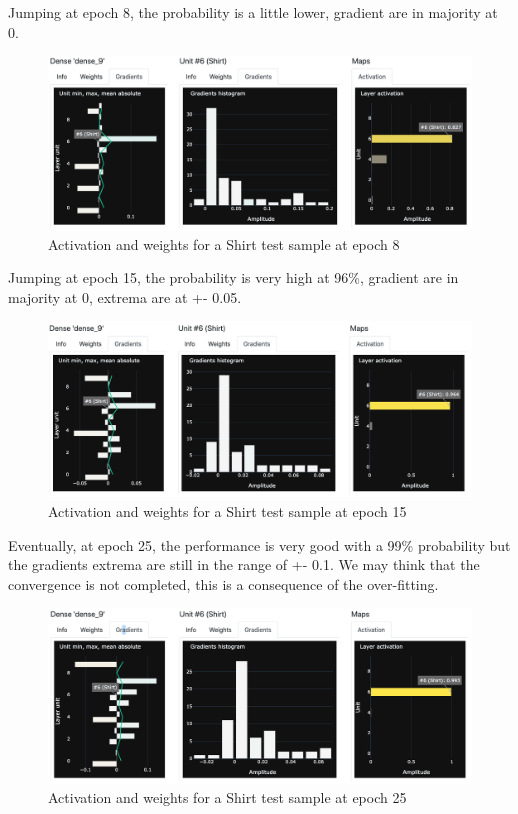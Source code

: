 Jumping at epoch 8, the probability is a little lower, gradient are in majority at 0.

\begin{figure}[H]
    \centering
    \includegraphics[scale=0.3]{images/dnn-viewer/TimeShirt_epoch8.png}
    \caption{Activation and weights for a Shirt test sample at epoch 8}
    \label{fig:dnn-viewer-time-shirt-epoch8}
\end{figure}

Jumping at epoch 15, the probability is very high at 96\%, gradient are in majority at 0, extrema are at +- 0.05.

\begin{figure}[H]
    \centering
    \includegraphics[scale=0.3]{images/dnn-viewer/TimeShirt_epoch15.png}
    \caption{Activation and weights for a Shirt test sample at epoch 15}
    \label{fig:dnn-viewer-time-shirt-epoch15}
\end{figure}

Eventually, at epoch 25, the performance is very good with a 99\% probability but the gradients extrema are still in the range of +- 0.1. We may think that the convergence is not completed, this is a consequence of the over-fitting.

\begin{figure}[H]
    \centering
    \includegraphics[scale=0.3]{images/dnn-viewer/TimeShirt_epoch25.png}
    \caption{Activation and weights for a Shirt test sample at epoch 25}
    \label{fig:dnn-viewer-time-shirt-epoch25}
\end{figure}



